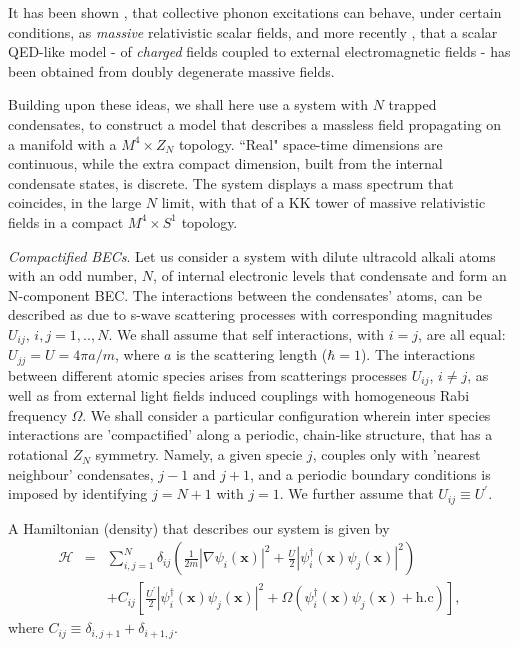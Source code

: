 \documentclass[aps,prl,twocolumn,unsortedaddress,superscriptaddress]{revtex4-1}
\newcommand{\x}{\mathbf{x}}
\begin{document}
It has been shown \cite{Visser}, that collective phonon excitations can behave, under certain conditions, as {\em massive} 
relativistic scalar fields, and more recently  \cite{leizerovitch2016},  that a scalar QED-like model - of {\em charged}  fields coupled to external electromagnetic fields -  has been obtained from doubly degenerate massive fields.

 Building upon these ideas, we shall here use a system with  $N$ trapped condensates, to construct a model that 
describes a massless field propagating on a manifold with a $M^4\times Z_N $ topology. ``Real" space-time dimensions are continuous, while the  extra compact dimension, built from the internal condensate states, is discrete.   
The system displays a mass spectrum that coincides, in the large $N$ limit, with that of a KK tower of massive relativistic fields in a compact $M^4\times S^1$ topology. 
 


 



  
{\em Compactified BECs}. Let us consider a system with dilute ultracold alkali atoms with an odd number, $N$, of internal electronic levels that condensate and form an N-component BEC.   The interactions between the condensates' atoms, can be described as due to
s-wave scattering processes with corresponding magnitudes
 $U_{ij}$, $i,j = 1,..,N$.  We shall assume that self interactions, with $i=j$, are all equal: $U_{jj}=U=4\pi a/m$, where $a$ is the scattering length ($\hbar= 1$). 
The interactions between different atomic species arises from scatterings processes $U_{ij}$, $i\neq j$, as well as from external light fields induced couplings with homogeneous Rabi frequency $\Omega$. We shall consider a particular configuration wherein inter species interactions are  'compactified' along a periodic, chain-like structure, that has a rotational $Z_N$ symmetry.
Namely, a given specie $j$,  couples
only with 'nearest neighbour' condensates, $j-1$ and $j+1$, and  a periodic boundary conditions is imposed by identifying $j=N+1$ with $j=1$.
We further assume that $U_{ij}\equiv U^{\prime}$.


A Hamiltonian (density) that describes our system is given by
\begin{eqnarray}\label{Hamiltonian}
\mathcal{H}&=&\sum_{i,j=1}^{N}\delta_{ij}\left(\frac{1}{2m}\left|\nabla\psi_{i}(\x)\right|^{2}+\frac{U}{2}|\psi^{\dagger}_{i}(\x)\psi_{j}(\x)|^{2}\right)\\
&&+C_{ij}\left[\frac{U^{\prime}}{2}|\psi^{\dagger}_{i}(\x)\psi_{j}(\x)|^{2}+\Omega\left(\psi_{i}^{\dagger}(\x)\psi_{j}(\x)+\text{h.c}\right)\right],\nonumber
\end{eqnarray}
where $C_{ij}\equiv \delta_{i,j+1}+\delta_{i+1,j}$.
\end{document}
